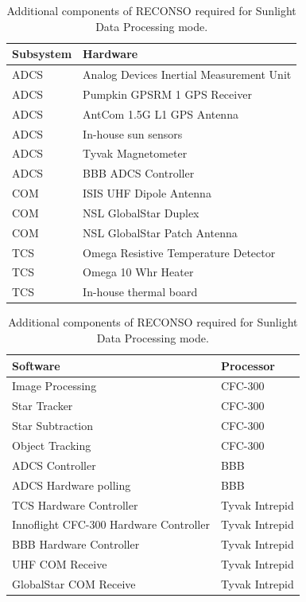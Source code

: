 \documentclass{article}
\begin{document}
\begin{table}[h!]
\caption{Additional components of RECONSO required for Sunlight Data Processing mode.}
\begin{adjustbox}{center}
\begin{tabular}{|l|l|}
\hline
Subsystem & Hardware \\ \hline \hline
ADCS & Analog Devices Inertial Measurement Unit  \\ \hline
ADCS & Pumpkin GPSRM 1 GPS Receiver \\ \hline
ADCS & AntCom 1.5G L1 GPS Antenna  \\ \hline
ADCS & In-house sun sensors  \\ \hline
ADCS & Tyvak Magnetometer \\ \hline
ADCS & BBB ADCS Controller \\ \hline \hline
COM & ISIS UHF Dipole Antenna  \\ \hline
COM & NSL GlobalStar Duplex  \\ \hline
COM & NSL GlobalStar Patch Antenna \\ \hline \hline
TCS & Omega Resistive Temperature Detector \\ \hline
TCS & Omega 10 Whr Heater  \\ \hline
TCS & In-house thermal board \\ \hline
\end{tabular}

\quad

\begin{tabular}{|l|l|}
\hline
Software & Processor \\ \hline \hline
Image Processing & CFC-300 \\ \hline
Star Tracker & CFC-300 \\ \hline
Star Subtraction & CFC-300 \\ \hline
Object Tracking & CFC-300 \\ \hline \hline
ADCS Controller & BBB \\ \hline
ADCS Hardware polling & BBB \\ \hline \hline
TCS Hardware Controller & Tyvak Intrepid \\ \hline
Innoflight CFC-300 Hardware Controller & Tyvak Intrepid \\ \hline
BBB Hardware Controller & Tyvak Intrepid \\ \hline
UHF COM Receive & Tyvak Intrepid \\ \hline
GlobalStar COM Receive & Tyvak Intrepid \\ \hline
\end{tabular}
\end{adjustbox}
\end{table}
\end{document}
